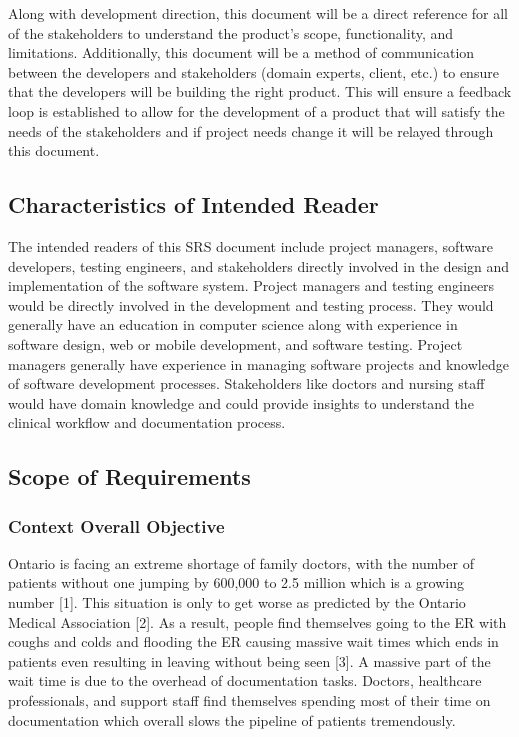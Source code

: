 \documentclass[12pt]{article}
\begin{document}
  Along with development direction, this document will be a direct reference for all of the stakeholders to understand the product's scope, functionality, and limitations. Additionally, this document will be a method of communication between the developers and stakeholders (domain experts, client, etc.) to ensure that the developers will be building the right product. This will ensure a feedback loop is established to allow for the development of a product that will satisfy the needs of the stakeholders and if project needs change it will be relayed through this document.


\subsection{Characteristics of Intended Reader} \label{sec_IntendedReader} 

The intended readers of this SRS document include project managers, software developers, testing engineers, and stakeholders directly involved in the design and implementation of the software system. Project managers and testing engineers would be directly involved in the development and testing process. They would generally have an education in computer science along with experience in software design, web or mobile development, and software testing. Project managers generally have experience in managing software projects and knowledge of software development processes. Stakeholders like doctors and nursing staff would have domain knowledge and could provide insights to understand the clinical workflow and documentation process. 

\subsection{Scope of Requirements} \label{sec_ScopeOfRequirements}


\subsubsection{Context Overall Objective} \label{sec_ContextOverallObjective}

Ontario is facing an extreme shortage of family doctors, with the number of patients without one jumping by 600,000 to 2.5 million which is a growing number [1]. This situation is only to get worse as predicted by the Ontario Medical Association [2]. As a result, people find themselves going to the ER with coughs and colds and flooding the ER causing massive wait times which ends in patients even resulting in leaving without being seen [3]. A massive part of the wait time is due to the overhead of documentation tasks. Doctors, healthcare professionals, and support staff find themselves spending most of their time on documentation which overall slows the pipeline of patients tremendously.
\end{document}
